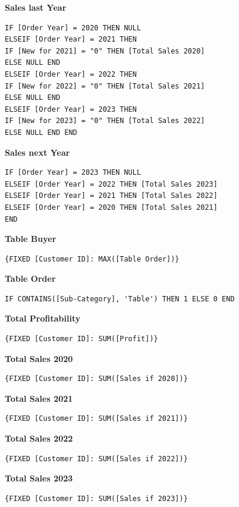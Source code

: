 \documentclass[12pt,a4paper]{article}
\begin{document}
\textbf{Sales last Year}
\begin{lstlisting}[style=customstyle]
IF [Order Year] = 2020 THEN NULL
ELSEIF [Order Year] = 2021 THEN
IF [New for 2021] = "0" THEN [Total Sales 2020]
ELSE NULL END
ELSEIF [Order Year] = 2022 THEN
IF [New for 2022] = "0" THEN [Total Sales 2021]
ELSE NULL END
ELSEIF [Order Year] = 2023 THEN
IF [New for 2023] = "0" THEN [Total Sales 2022]
ELSE NULL END END
\end{lstlisting}
\vspace*{1cm}

\textbf{Sales next Year}
\begin{lstlisting}[style=customstyle]
IF [Order Year] = 2023 THEN NULL
ELSEIF [Order Year] = 2022 THEN [Total Sales 2023]
ELSEIF [Order Year] = 2021 THEN [Total Sales 2022]
ELSEIF [Order Year] = 2020 THEN [Total Sales 2021]
END
\end{lstlisting}
\vspace*{1cm}

\textbf{Table Buyer}
\begin{lstlisting}[style=customstyle]
{FIXED [Customer ID]: MAX([Table Order])}
\end{lstlisting}
\vspace*{1cm}

\textbf{Table Order}
\begin{lstlisting}[style=customstyle]
IF CONTAINS([Sub-Category], 'Table') THEN 1 ELSE 0 END
\end{lstlisting}
\vspace*{1cm}

\textbf{Total Profitability}
\begin{lstlisting}[style=customstyle]
{FIXED [Customer ID]: SUM([Profit])}
\end{lstlisting}
\vspace*{1cm}

\textbf{Total Sales 2020}
\begin{lstlisting}[style=customstyle]
{FIXED [Customer ID]: SUM([Sales if 2020])}
\end{lstlisting}
\vspace*{1cm}

\textbf{Total Sales 2021}
\begin{lstlisting}[style=customstyle]
{FIXED [Customer ID]: SUM([Sales if 2021])}
\end{lstlisting}
\vspace*{1cm}

\textbf{Total Sales 2022}
\begin{lstlisting}[style=customstyle]
{FIXED [Customer ID]: SUM([Sales if 2022])}
\end{lstlisting}
\vspace*{1cm}

\textbf{Total Sales 2023}
\begin{lstlisting}[style=customstyle]
{FIXED [Customer ID]: SUM([Sales if 2023])}
\end{lstlisting}
\vspace*{1cm}
\end{document}

